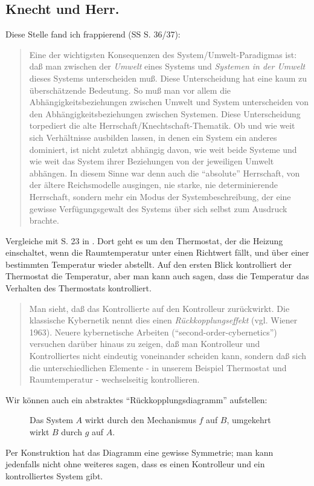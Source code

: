 \documentclass[a4paper, 10pt]{amsart}
\begin{document}
\subsection{Knecht und Herr.} Diese Stelle fand ich frappierend (SS S. 36/37):
\begin{quotation}
Eine der wichtigsten Konsequenzen des System/Umwelt-Paradigmas ist: daß man zwischen der \emph{Umwelt} eines Systems und \emph{Systemen in der Umwelt} dieses Systems unterscheiden muß. Diese Unterscheidung hat eine kaum zu überschätzende Bedeutung. So muß man vor allem die Ab\-häng\-ig\-keits\-be\-zieh\-ung\-en zwischen Umwelt und System unterscheiden von den Ab\-häng\-ig\-keits\-be\-zieh\-ung\-en zwischen Systemen. Diese Unterscheidung torpediert die alte Herr\-schaft/Knecht\-schaft-Thematik. Ob und wie weit sich Verhältnisse ausbilden lassen, in denen ein System ein anderes dominiert, ist nicht zuletzt abhängig davon, wie weit beide Systeme und wie weit das System ihrer Beziehungen von der jeweiligen Umwelt abhängen. In diesem Sinne war denn auch die ``absolute'' Herrschaft, von der ältere Reichsmodelle ausgingen, nie starke, nie determinierende Herrschaft, sondern mehr ein Modus der Systembeschreibung, der eine gewisse Verfügungsgewalt des Systems über sich selbst zum Ausdruck brachte.
\end{quotation}
Vergleiche mit S. 23 in \cite{kneerNiklasLuhmannsTheorie1993}. Dort geht es um den Thermostat, der die Heizung einschaltet, wenn die Raumtemperatur unter einen Richtwert fällt, und über einer bestimmten Temperatur wieder abstellt. Auf den ersten Blick kontrolliert der Thermostat die Temperatur, aber man kann auch sagen, dass die Temperatur das Verhalten des Thermostats kontrolliert.
\begin{quotation}
Man sieht, daß das Kontrollierte auf den Kontrolleur zurückwirkt. Die klassische Kybernetik nennt dies einen \emph{Rückkopplungseffekt} (vgl. Wiener 1963). Neuere kybernetische Arbeiten (``second-order-cybernetics'') versuchen darüber hinaus zu zeigen, daß man Kontrolleur und Kontrolliertes nicht eindeutig voneinander scheiden kann, sondern daß sich die unterschiedlichen Elemente - in unserem Beispiel Thermostat und Raumtemperatur - wechselseitig kontrollieren.
\end{quotation}
Wir können auch ein abstraktes ``Rückkopplungsdiagramm'' aufstellen:
\begin{figure}
\centering
{}
\caption{Das System $A$ wirkt durch den Mechanismus $f$ auf $B$, umgekehrt wirkt $B$ durch $g$ auf $A$.}
\end{figure}
Per Konstruktion hat das Diagramm eine gewisse Symmetrie; man kann jedenfalls nicht ohne weiteres sagen, dass es einen Kontrolleur und ein kontrolliertes System gibt.
\end{document}

